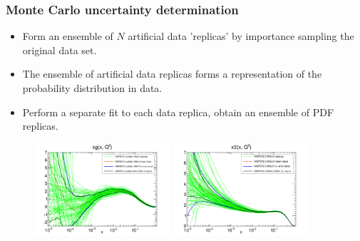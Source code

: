\documentclass[10pt]{beamer}
\begin{document}
\begin{frame}
\frametitle{Monte Carlo uncertainty determination}
\begin{itemize}
\item<1->Form an ensemble of $N$ artificial data 'replicas' by importance sampling the original data set.
\\
\item<1->The ensemble of artificial data replicas forms a representation of the probability distribution in data.
\\
\item<1->Perform a separate fit to each data replica, obtain an ensemble of PDF replicas.
\\
\end{itemize}
 \begin{figure}[b!]
    \begin{center}
      \includegraphics[width=0.45\textwidth]{figures/xg_rep_Q_2_log-23coll-nnlo.pdf}
      \includegraphics[width=0.45\textwidth]{figures/xSinglet_rep_Q_2_log-23-nnlo.pdf}
    \end{center}
    \vskip-0.5cm
    \label{fig:pdf-jets}
\end{figure}

\end{frame}
\end{document}
